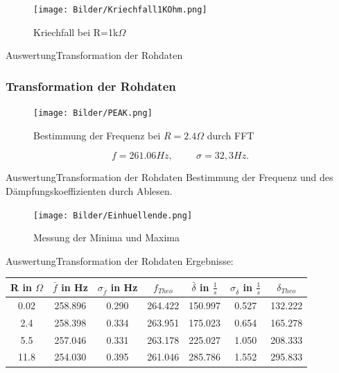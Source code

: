 \documentclass[11pt]{beamer}
\begin{document}
\begin{frame}
\begin{figure}[H]
\caption{Kriechfall bei R=1k$\Omega$}
\centering
\texttt{[image: Bilder/Kriechfall1KOhm.png]}
\end{figure}
\end{frame}



\begin{frame}{Auswertung}{Transformation der Rohdaten}
\subsubsection{Transformation der Rohdaten}
\begin{figure}[H]
\caption{Bestimmung der Frequenz bei $R=2.4\Omega$ durch FFT}
\centering
\texttt{[image: Bilder/PEAK.png]}
\end{figure}
\begin{equation}
f=261.06 Hz, \hspace{1cm} \sigma=32,3 Hz.
\end{equation}
\end{frame}

\begin{frame}{Auswertung}{Transformation der Rohdaten}
Bestimmung der Frequenz und des Dämpfungskoeffizienten durch Ablesen.
\begin{figure}[H]
\caption{Messung der Minima und Maxima}
\centering
\texttt{[image: Bilder/Einhuellende.png]}
\end{figure}
\end{frame}

\begin{frame}{Auswertung}{Transformation der Rohdaten}
Ergebnisse:
\begin{center}
\begin{tabular}{c|c|c|c|c|c|c}
R in $\Omega$ & $\bar{f}$ in Hz & $\sigma_{\bar{f}}$ in Hz & $f_{Theo}$&  $\bar{\delta}$ in $\frac{1}{s}$ & $\sigma_{\bar{\delta}}$ in $\frac{1}{s}$  & $\delta_{Theo}$ \\ 
\hline 
0.02 & 258.896 & 0.290 & 264.422 & 150.997 & 0.527 & 132.222 \\ 
\hline 
2.4 & 258.398 & 0.334 & 263.951 & 175.023 & 0.654  & 165.278\\ 
\hline 
5.5 & 257.046 & 0.331 & 263.178 & 225.027 & 1.050  & 208.333\\ 
\hline 
11.8 & 254.030 & 0.395 & 261.046 & 285.786 & 1.552  & 295.833 \\ 
\end{tabular} 
\end{center}
\end{frame}
\end{document}
